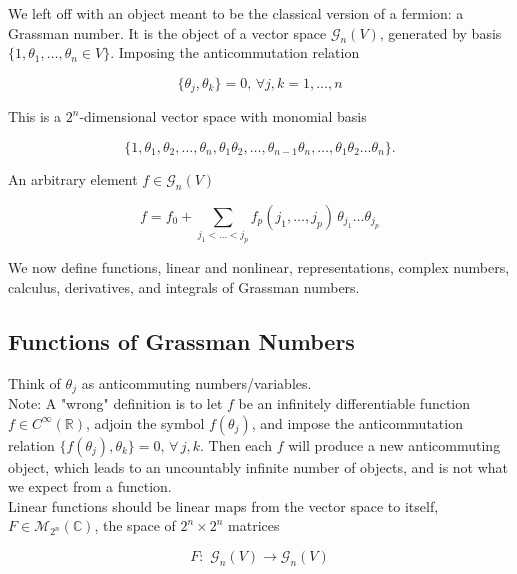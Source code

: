 
\noindent We left off with an object meant to be the classical version of a fermion: a Grassman number. It is the object of a vector space $ \mathcal{G}_n (V)$, generated by basis $\{ 1, \theta_1, \dots, \theta_n \in V \}$. Imposing the anticommutation relation 

\begin{equation}
\{\theta_j, \theta_k \} = 0, \, \forall j,k = 1, \dots, n
\end{equation}

\noindent This is a $2^n$-dimensional vector space with monomial basis

\begin{equation}
\{ 1, \theta_1, \theta_2, \dots, \theta_n, \theta_1 \theta_2, \dots , \theta_{n-1} \theta_n, \dots , \theta_1 \theta_2 \dots \theta_n \}.
\end{equation}

\noindent An arbitrary element $f \in \mathcal{G}_n (V)$

\begin{equation}
f = f_0 + \sum_{j_1 < \dots < j_p} f_p (j_1, \dots , j_p) \, \theta_{j_1} \dots \theta_{j_p}
\end{equation}

\noindent We now define functions, linear and nonlinear, representations, complex numbers, calculus, derivatives, and integrals of Grassman numbers.

\subsection*{Functions of Grassman Numbers}

\noindent Think of $\theta_j$ as anticommuting numbers/variables. \\

\noindent Note: A "wrong" definition is to let $f$ be an infinitely differentiable function $f \in C^\infty (\mathbb{R})$, adjoin the symbol $f(\theta_j)$, and impose the anticommutation relation $\{ f(\theta_j), \theta_k \} = 0, \, \forall \, j, k$. Then each $f$ will produce a new anticommuting object, which leads to an uncountably infinite number of objects, and is not what we expect from a function. \\

\noindent Linear functions should be linear maps from the vector space to itself, $F \in \mathcal{M}_{2^n} (\mathbb{C})$, the space of $2^n \times 2^n$ matrices

\begin{equation}
F : \,\, \mathcal{G}_n (V) \rightarrow \mathcal{G}_n (V)
\end{equation}

